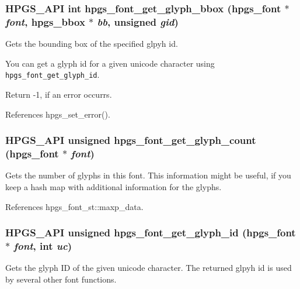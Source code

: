 \subsubsection[hpgs\_\-font\_\-get\_\-glyph\_\-bbox]{\setlength{\rightskip}{0pt plus 5cm}HPGS\_\-API int hpgs\_\-font\_\-get\_\-glyph\_\-bbox ({\bf hpgs\_\-font} $\ast$ {\em font}, \/  {\bf hpgs\_\-bbox} $\ast$ {\em bb}, \/  unsigned {\em gid})}\label{group__font_ga15d6b275995ad582a992d697e6e69e0}


Gets the bounding box of the specified glpyh id.

You can get a glyph id for a given unicode character using {\tt hpgs\_\-font\_\-get\_\-glyph\_\-id}.

Return -1, if an error occurrs. 

References hpgs\_\-set\_\-error().
\subsubsection[hpgs\_\-font\_\-get\_\-glyph\_\-count]{\setlength{\rightskip}{0pt plus 5cm}HPGS\_\-API unsigned hpgs\_\-font\_\-get\_\-glyph\_\-count ({\bf hpgs\_\-font} $\ast$ {\em font})}\label{group__font_g7c2cc74c151939a86011d1985e121e89}


Gets the number of glyphs in this font. This information might be useful, if you keep a hash map with additional information for the glyphs. 

References hpgs\_\-font\_\-st::maxp\_\-data.
\subsubsection[hpgs\_\-font\_\-get\_\-glyph\_\-id]{\setlength{\rightskip}{0pt plus 5cm}HPGS\_\-API unsigned hpgs\_\-font\_\-get\_\-glyph\_\-id ({\bf hpgs\_\-font} $\ast$ {\em font}, \/  int {\em uc})}\label{group__font_g77eece2579503c8b8f61b457b330d3aa}


Gets the glyph ID of the given unicode character. The returned glpyh id is used by several other font functions. 
